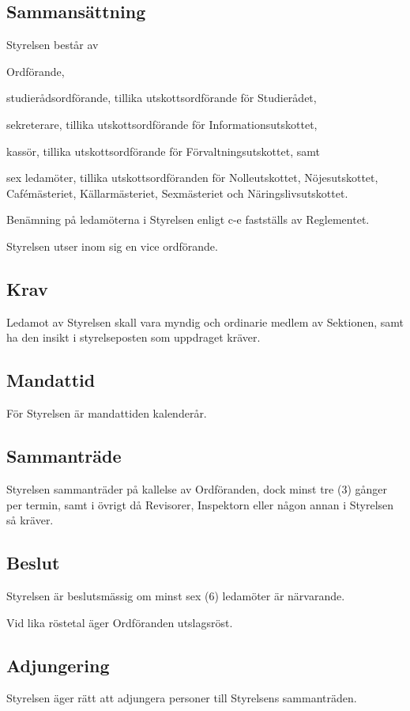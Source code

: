 \documentclass[10pt]{article}
\begin{document}
\subsection{Sammansättning}
Styrelsen består av
\begin{alphlist}
\item Ordförande,
\item studierådsordförande, tillika utskottsordförande för Studierådet,
\item sekreterare, tillika utskottsordförande för Informationsutskottet,
\item kassör, tillika utskottsordförande för Förvaltningsutskottet, samt
\item sex ledamöter, tillika utskottsordföranden för Nolleutskottet,
    Nöjesutskottet, Cafémästeriet, Källarmästeriet, Sexmästeriet och
    Näringslivsutskottet.
\end{alphlist}

Benämning på ledamöterna i Styrelsen enligt c-e fastställs av Reglementet.

Styrelsen utser inom sig en vice ordförande.

\subsection{Krav}
Ledamot av Styrelsen skall vara myndig och ordinarie medlem av Sektionen,
samt ha den insikt i styrelseposten som uppdraget kräver.

\subsection{Mandattid}
För Styrelsen är mandattiden kalenderår.

\subsection{Sammanträde}
Styrelsen sammanträder på kallelse av Ordföranden, dock minst tre (3) gånger
per termin, samt i övrigt då Revisorer, Inspektorn eller någon annan i
Styrelsen så kräver.

\subsection{Beslut}
Styrelsen är beslutsmässig om minst sex (6) ledamöter är närvarande.

Vid lika röstetal äger Ordföranden utslagsröst.

\subsection{Adjungering}
Styrelsen äger rätt att adjungera personer till Styrelsens sammanträden.
\end{document}
